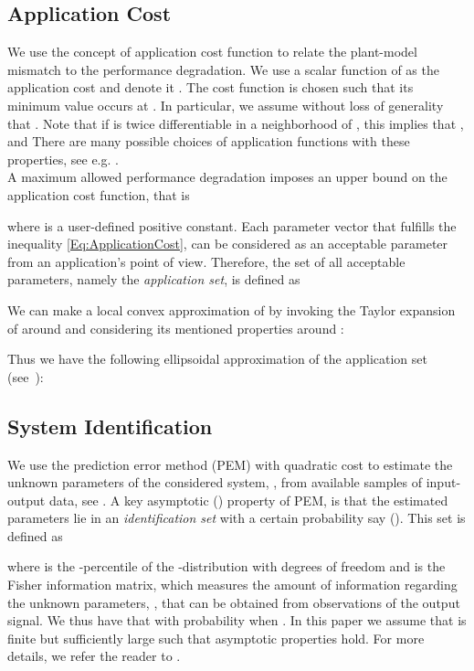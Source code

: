 \documentclass{ifacconf}
\begin{document}
\subsection{Application Cost}
We use the concept of application cost function to relate the plant-model mismatch to the performance degradation. We use a scalar function of  as the application cost and denote it .
The cost function is chosen such that its minimum value occurs at . In particular, we assume without loss of generality that . Note that if  is twice differentiable in a neighborhood of , this implies that
 ,  and 
There are many possible choices of application functions with these properties, see e.g. \cite{Larsson2011a}.
\\
A maximum allowed performance degradation imposes an upper bound on the application cost function, that is

where  is a user-defined positive constant. Each parameter vector  that fulfills the inequality \eqref{Eq:ApplicationCost}, can be considered as an acceptable parameter from an application's point of view. Therefore, the set of all acceptable parameters, namely the \emph{application set}, is defined as

We can make a local convex approximation of  by invoking the Taylor expansion of  around  and considering its mentioned properties around :

Thus we have the following ellipsoidal approximation of the application set (see~\cite{Hjalmarsson2009}):

\vspace{-0.3cm}
\subsection{System Identification}
We use the prediction error method (PEM) with quadratic cost to estimate the unknown parameters of the considered system, , from  available samples of input-output data, see \cite{L.Ljung1999}. A key asymptotic () property of PEM, is that the estimated parameters lie in an \emph{identification set} with a certain probability say  (\cite{Wahlberg&Ljung:92}). This set is defined as

where  is the -percentile of the -distribution with  degrees of freedom and  is the Fisher information matrix, which measures the amount of information regarding the unknown parameters, , that can be obtained from observations of the output signal. We thus have that  with probability  when . In this paper we assume that  is finite but sufficiently large such that asymptotic properties hold. For more details, we refer the reader to \cite{L.Ljung1999}.
\end{document}
